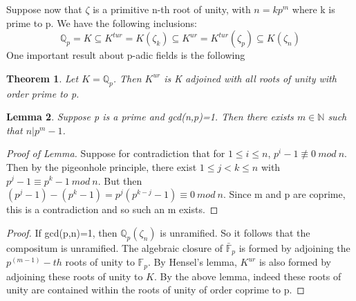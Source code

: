 \documentclass[preprint,12pt,reqno]{elsarticle}
\newtheorem{theorem}{Theorem}
\newtheorem{lemma}[theorem]{Lemma}
\begin{document}
Suppose now that $\zeta$ is a primitive n-th root of unity, with $n=kp^{m}$ where k is prime to p. We have the following inclusions:\begin{equation}
    \mathbb{Q}_{p}=K\subseteq K^{tur}=K(\zeta_k)\subseteq K^{ur} = K^{tur}(\zeta_{p})\subseteq K(\zeta_n)
\end{equation}
One important result about p-adic fields is the following \begin{theorem}
    Let $K=\mathbb{Q}_p$. Then $K^{ur}$ is K adjoined with all roots of unity with order prime to p. 
\end{theorem}
\begin{lemma}
Suppose p is a prime and gcd(n,p)=1. Then there exists $m\in\mathbb{N}$ such that $n|p^m-1$.
\end{lemma}
\begin{proof}[Proof of Lemma]
Suppose for contradiction that for $1\leq i \leq n$, $p^i-1\not \equiv 0\: mod \: n$. Then by the pigeonhole principle, there exist $1\leq j < k \leq n $ with $p^j-1 \equiv p^k-1 \: mod \: n$. But then $(p^j-1)-(p^k-1)=p^j(p^{k-j}-1)\equiv 0\:mod\:n$. Since m and p are coprime, this is a contradiction and so such an m exists. 
\end{proof}
\begin{proof}
If gcd(p,n)=1, then $\mathbb{Q}_{p}(\zeta_n)$ is unramified. So it follows that the compositum is unramified. The algebraic closure of $\bar{\mathbb{F}}_{p}$ is formed by adjoining the $p^{(m-1)}-th$ roots of unity to $\mathbb{F}_p$. By Hensel's lemma, $K^{ur}$ is also formed by adjoining these roots of unity to $K$. By the above lemma, indeed these roots of unity are contained within the roots of unity of order coprime to p. 
\end{proof}
\end{document}
